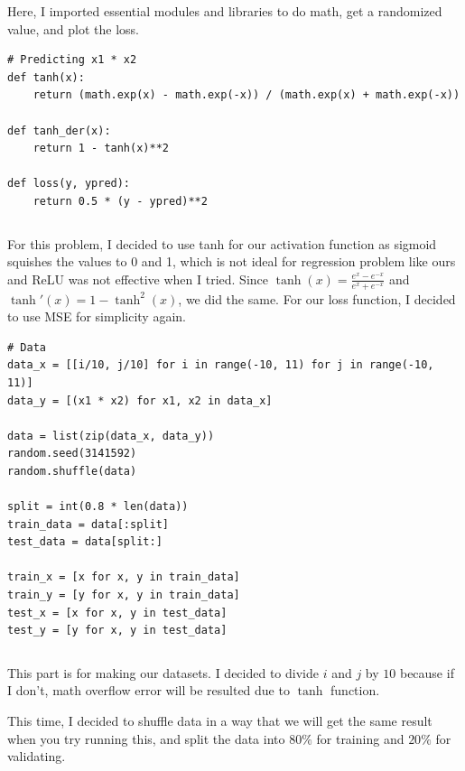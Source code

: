 \documentclass[../../main.tex]{subfiles}
\begin{document}
Here, I imported essential modules and libraries to do math, get
a randomized value, and plot the loss.

\begin{jupyter}
\begin{lstlisting}[style=jin]
# Predicting x1 * x2
def tanh(x):
    return (math.exp(x) - math.exp(-x)) / (math.exp(x) + math.exp(-x))

def tanh_der(x):
    return 1 - tanh(x)**2

def loss(y, ypred):
    return 0.5 * (y - ypred)**2
\end{lstlisting}
\begin{lstlisting}[style=jout]
\end{lstlisting}
\end{jupyter}

For this problem, I decided to use tanh for our activation function
as sigmoid squishes the values to 0 and 1, which is not ideal for
regression problem like ours and ReLU was not effective when I tried.
Since $\tanh(x) = \frac{e^x - e^{-x}}{e^x + e^{-x}}$ and $\tanh'(x) =
1 - \tanh^2(x)$, we did the same. For our loss function, I decided to
use MSE for simplicity again.

\begin{jupyter}
\begin{lstlisting}[style=jin]
# Data
data_x = [[i/10, j/10] for i in range(-10, 11) for j in range(-10, 11)]
data_y = [(x1 * x2) for x1, x2 in data_x]

data = list(zip(data_x, data_y))
random.seed(3141592)
random.shuffle(data)

split = int(0.8 * len(data))
train_data = data[:split]
test_data = data[split:]

train_x = [x for x, y in train_data]
train_y = [y for x, y in train_data]
test_x = [x for x, y in test_data]
test_y = [y for x, y in test_data]
\end{lstlisting}
\begin{lstlisting}[style=jout]
\end{lstlisting}
\end{jupyter}

This part is for making our datasets. I decided to divide $i$ and $j$
by $10$ because if I don't, math overflow error will be resulted
due to $\tanh$ function.

This time, I decided to shuffle data in a way that we will get the
same result when you try running this, and split the data into
$80\%$ for training and $20\%$ for validating.
\end{document}
